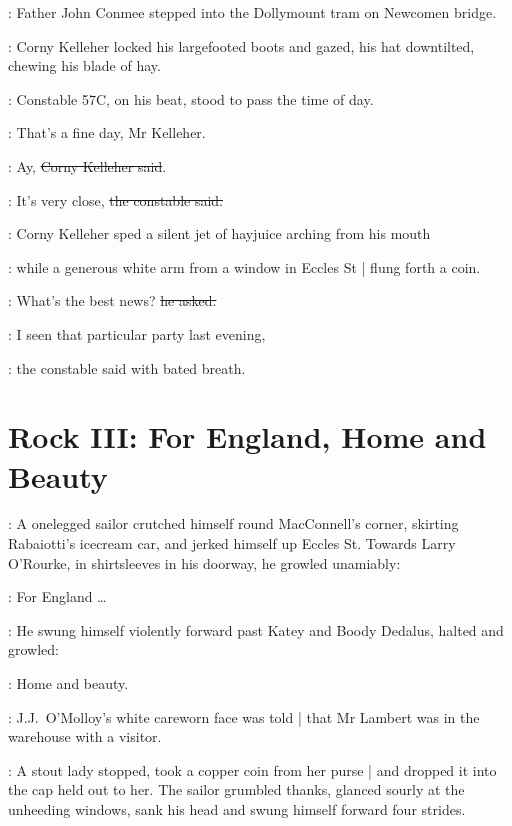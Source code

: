 \begin{interject}
    :
    Father John Conmee stepped into the Dollymount tram on Newcomen bridge.
\end{interject}

:
Corny Kelleher locked his largefooted boots and gazed,
his hat downtilted,
chewing his blade of hay.

:
Constable 57C,
on his beat,
stood to pass the time of day.

\constable:
That's a fine day, Mr Kelleher.

\corny:
Ay, \sout{Corny Kelleher said}.

\constable:
It's very close,
\sout{the constable said.}

:
Corny Kelleher sped a silent jet of hayjuice arching from his mouth

\begin{interject}
    :
    while a generous white arm from a window in Eccles St |
    flung forth a coin.
\end{interject}

\corny:
What's the best news? \sout{he asked.}

\constable:
I seen that particular party last evening,

:
the constable said with bated breath.


\section*{Rock III: For England, Home and Beauty}

:
A onelegged sailor crutched himself round MacConnell's corner,
skirting Rabaiotti's icecream car,
and jerked himself up Eccles St.
Towards Larry O'Rourke,
in shirtsleeves in his doorway,
he growled unamiably:

\sailor:
For England \ldots

:
He swung himself violently forward past Katey and Boody Dedalus,
halted and growled:

\sailor:
Home and beauty.

\begin{interject}
    :
    J.J.~O'Molloy's white careworn face was told |
    that Mr Lambert was in the warehouse with a visitor.
\end{interject}

:
A stout lady stopped,
took a copper coin from her purse |
and dropped it into the cap held out to her.
The sailor grumbled thanks,
glanced sourly at the unheeding windows,
sank his head
and swung himself forward four strides.

